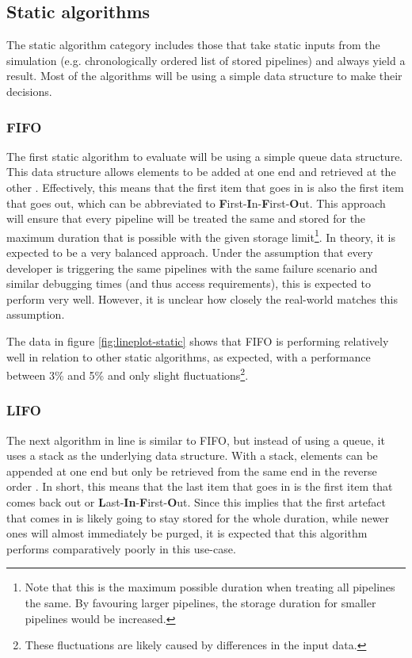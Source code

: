 \subsection{Static algorithms}\label{sec:static}
    The static algorithm category includes those that take static inputs from the simulation (e.g. chronologically ordered list of stored pipelines) and always yield a result. Most of the algorithms will be using a simple data structure to make their decisions.
    
    
    \subsubsection{FIFO}
        The first static algorithm to evaluate will be using a simple queue data structure. This data structure allows elements to be added at one end and retrieved at the other \cite{data-structures}. Effectively, this means that the first item that goes in is also the first item that goes out, which can be abbreviated to \textbf{F}irst-\textbf{I}n-\textbf{F}irst-\textbf{O}ut. This approach will ensure that every pipeline will be treated the same and stored for the maximum duration that is possible with the given storage limit\footnote{Note that this is the maximum possible duration when treating all pipelines the same. By favouring larger pipelines, the storage duration for smaller pipelines would be increased.}. In theory, it is expected to be a very balanced approach. Under the assumption that every developer is triggering the same pipelines with the same failure scenario and similar debugging times (and thus access requirements), this is expected to perform very well. However, it is unclear how closely the real-world matches this assumption.
        
        The data in figure \ref{fig:lineplot-static} shows that FIFO is performing relatively well in relation to other static algorithms, as expected, with a performance between 3\% and 5\% and only slight fluctuations\footnote{These fluctuations are likely caused by differences in the input data.}.
    
    \subsubsection{LIFO}
        The next algorithm in line is similar to FIFO, but instead of using a queue, it uses a stack as the underlying data structure. With a stack, elements can be appended at one end but only be retrieved from the same end in the reverse order \cite{data-structures}. In short, this means that the last item that goes in is the first item that comes back out or \textbf{L}ast-\textbf{In}-\textbf{F}irst-\textbf{O}ut. Since this implies that the first artefact that comes in is likely going to stay stored for the whole duration, while newer ones will almost immediately be purged, it is expected that this algorithm performs comparatively poorly in this use-case.
        

